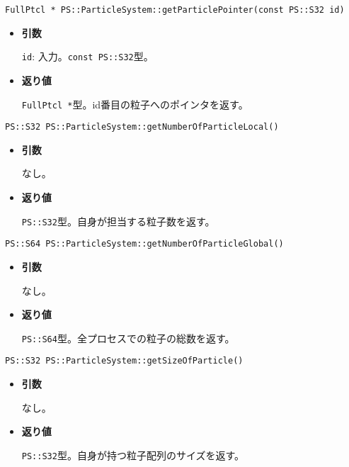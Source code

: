 \begin{screen}
\begin{verbatim}
FullPtcl * PS::ParticleSystem::getParticlePointer(const PS::S32 id)
\end{verbatim}
\end{screen}

\begin{itemize}

\item{{\bf 引数}}

{\tt id}: 入力。{\tt const PS::S32}型。

\item{{\bf 返り値}}

{\tt FullPtcl *}型。id番目の粒子へのポインタを返す。


\end{itemize}


\begin{screen}
\begin{verbatim}
PS::S32 PS::ParticleSystem::getNumberOfParticleLocal()
\end{verbatim}
\end{screen}

\begin{itemize}

\item{{\bf 引数}}

なし。

\item{{\bf 返り値}}

{\tt PS::S32}型。自身が担当する粒子数を返す。

\end{itemize}


\begin{screen}
\begin{verbatim}
PS::S64 PS::ParticleSystem::getNumberOfParticleGlobal()
\end{verbatim}
\end{screen}

\begin{itemize}

\item{{\bf 引数}}

なし。

\item{{\bf 返り値}}

{\tt PS::S64}型。全プロセスでの粒子の総数を返す。

\end{itemize}


\begin{screen}
\begin{verbatim}
PS::S32 PS::ParticleSystem::getSizeOfParticle()
\end{verbatim}
\end{screen}

\begin{itemize}

\item{{\bf 引数}}

なし。

\item{{\bf 返り値}}

{\tt PS::S32}型。自身が持つ粒子配列のサイズを返す。

\end{itemize}


